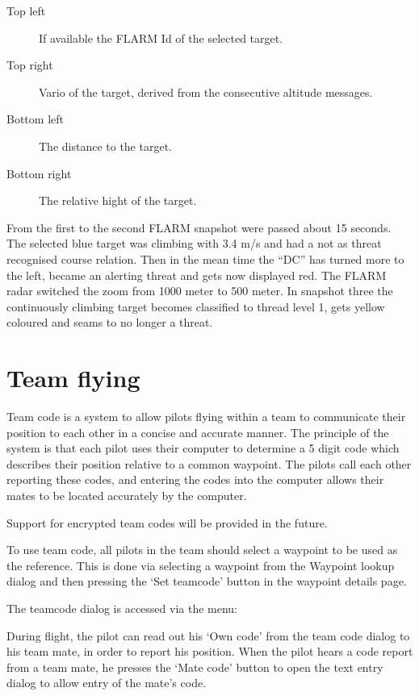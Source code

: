\documentclass[a4paper,12pt]{refrep}
\begin{document}
\begin{description}
\item[Top left]  If available the FLARM Id of the selected target. 
\item[Top right]  Vario of the target, derived from the consecutive altitude
messages.
\item[Bottom left]  The distance to the target.
\item[Bottom right]  The relative hight of the target. 
\end{description}

From the first to the second FLARM snapshot were passed about 15 seconds. The
selected blue target was climbing with 3.4 m/s and had a not as threat
recognised course relation.  Then in the mean time the ``DC'' has turned more to
the left, became an alerting threat and gets now displayed red.  The FLARM
radar switched the zoom from 1000 meter to 500 meter. In snapshot three the
continuously climbing target becomes classified to thread level 1, gets yellow 
coloured and seams to no longer a threat.  


\section{Team flying}

  Team code is a system to allow pilots flying within a team to
  communicate their position to each other in a concise and accurate
  manner.  The principle of the system is that each pilot uses their
  computer to determine a 5 digit code which describes their position
  relative to a common waypoint.  The pilots call each other reporting
  these codes, and entering the codes into the computer allows their
  mates to be located accurately by the computer.

  Support for encrypted team codes will be provided in the future.

  To use team code, all pilots in the team should select a waypoint to
  be used as the reference.  This is done via selecting a waypoint
  from the Waypoint lookup dialog and then pressing the `Set teamcode'
  button in the waypoint details page.

  The teamcode dialog is accessed via the menu:

   \blink{}\blink{}

  During flight, the pilot can read out his `Own code' from the team
  code dialog to his team mate, in order to report his position.  When
  the pilot hears a code report from a team mate, he presses the `Mate
  code' button to open the text entry dialog to allow entry of the
  mate's code.
\end{document}
